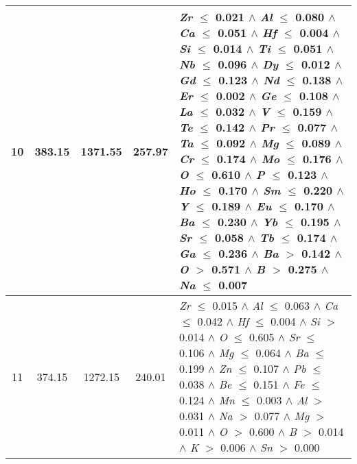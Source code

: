 \begin{table}[!htbp]
\begin{tabular}{ccccm{}}
		10 & 383.15 & 1371.55 & 257.97 & \textit{Zr} $\le$ 0.021 $\wedge$ \textit{Al} $\le$ 0.080 $\wedge$ \textit{Ca} $\le$ 0.051 $\wedge$ \textit{Hf} $\le$ 0.004 $\wedge$ \textit{Si} $\le$ 0.014 $\wedge$ \textit{Ti} $\le$ 0.051 $\wedge$ \textit{Nb} $\le$ 0.096 $\wedge$ \textit{Dy} $\le$ 0.012 $\wedge$ \textit{Gd} $\le$ 0.123 $\wedge$ \textit{Nd} $\le$ 0.138 $\wedge$ \textit{Er} $\le$ 0.002 $\wedge$ \textit{Ge} $\le$ 0.108 $\wedge$ \textit{La} $\le$ 0.032 $\wedge$ \textit{V} $\le$ 0.159 $\wedge$ \textit{Te} $\le$ 0.142 $\wedge$ \textit{Pr} $\le$ 0.077 $\wedge$ \textit{Ta} $\le$ 0.092 $\wedge$ \textit{Mg} $\le$ 0.089 $\wedge$ \textit{Cr} $\le$ 0.174 $\wedge$ \textit{Mo} $\le$ 0.176 $\wedge$ \textit{O} $\le$ 0.610 $\wedge$ \textit{P} $\le$ 0.123 $\wedge$ \textit{Ho} $\le$ 0.170 $\wedge$ \textit{Sm} $\le$ 0.220 $\wedge$ \textit{Y} $\le$ 0.189 $\wedge$ \textit{Eu} $\le$ 0.170 $\wedge$ \textit{Ba} $\le$ 0.230 $\wedge$ \textit{Yb} $\le$ 0.195 $\wedge$ \textit{Sr} $\le$ 0.058 $\wedge$ \textit{Tb} $\le$ 0.174 $\wedge$ \textit{Ga} $\le$ 0.236 $\wedge$ \textit{Ba} $>$ 0.142 $\wedge$ \textit{O} $>$ 0.571 $\wedge$ \textit{B} $>$ 0.275 $\wedge$ \textit{Na} $\le$ 0.007\\
		\hline
		11 & 374.15 & 1272.15 & 240.01 & \textit{Zr} $\le$ 0.015 $\wedge$ \textit{Al} $\le$ 0.063 $\wedge$ \textit{Ca} $\le$ 0.042 $\wedge$ \textit{Hf} $\le$ 0.004 $\wedge$ \textit{Si} $>$ 0.014 $\wedge$ \textit{O} $\le$ 0.605 $\wedge$ \textit{Sr} $\le$ 0.106 $\wedge$ \textit{Mg} $\le$ 0.064 $\wedge$ \textit{Ba} $\le$ 0.199 $\wedge$ \textit{Zn} $\le$ 0.107 $\wedge$ \textit{Pb} $\le$ 0.038 $\wedge$ \textit{Be} $\le$ 0.151 $\wedge$ \textit{Fe} $\le$ 0.124 $\wedge$ \textit{Mn} $\le$ 0.003 $\wedge$ \textit{Al} $>$ 0.031 $\wedge$ \textit{Na} $>$ 0.077 $\wedge$ \textit{Mg} $>$ 0.011 $\wedge$ \textit{O} $>$ 0.600 $\wedge$ \textit{B} $>$ 0.014 $\wedge$ \textit{K} $>$ 0.006 $\wedge$ \textit{Sn} $>$ 0.000\\
		\bottomrule
	\end{tabular}
\end{table}
